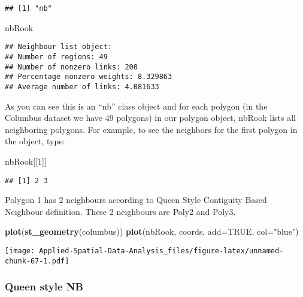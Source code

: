 \documentclass[
]{book}
\newenvironment{Shaded}{\begin{snugshade}}{\end{snugshade}}
\newcommand{\DataTypeTok}[1]{\textcolor[rgb]{0.13,0.29,0.53}{#1}}
\newcommand{\DecValTok}[1]{\textcolor[rgb]{0.00,0.00,0.81}{#1}}
\newcommand{\KeywordTok}[1]{\textcolor[rgb]{0.13,0.29,0.53}{\textbf{#1}}}
\newcommand{\NormalTok}[1]{#1}
\newcommand{\OtherTok}[1]{\textcolor[rgb]{0.56,0.35,0.01}{#1}}
\newcommand{\StringTok}[1]{\textcolor[rgb]{0.31,0.60,0.02}{#1}}
\begin{document}
\begin{verbatim}
## [1] "nb"
\end{verbatim}

\begin{Shaded}
\begin{Highlighting}[]
\NormalTok{nbRook}
\end{Highlighting}
\end{Shaded}

\begin{verbatim}
## Neighbour list object:
## Number of regions: 49 
## Number of nonzero links: 200 
## Percentage nonzero weights: 8.329863 
## Average number of links: 4.081633
\end{verbatim}

As you can see this is an ``nb'' class object and for each polygon (in the Columbus dataset we have 49 polygons) in our polygon object, nbRook lists all neighboring polygons. For example, to see the neighbors for the first polygon in the object, type:

\begin{Shaded}
\begin{Highlighting}[]
\NormalTok{nbRook[[}\DecValTok{1}\NormalTok{]]}
\end{Highlighting}
\end{Shaded}

\begin{verbatim}
## [1] 2 3
\end{verbatim}

Polygon 1 has 2 neighbours according to Queen Style Contiguity Based Neighbour definition. These 2 neighbours are Poly2 and Poly3.

\begin{Shaded}
\begin{Highlighting}[]
\KeywordTok{plot}\NormalTok{(}\KeywordTok{st_geometry}\NormalTok{(columbus))}
\KeywordTok{plot}\NormalTok{(nbRook, coords, }\DataTypeTok{add=}\OtherTok{TRUE}\NormalTok{, }\DataTypeTok{col=}\StringTok{"blue"}\NormalTok{)}
\end{Highlighting}
\end{Shaded}

\texttt{[image: Applied-Spatial-Data-Analysis\_files/figure-latex/unnamed-chunk-67-1.pdf]}

\hypertarget{queen-style-nb}{%
\subsubsection{Queen style NB}\label{queen-style-nb}}
\end{document}
